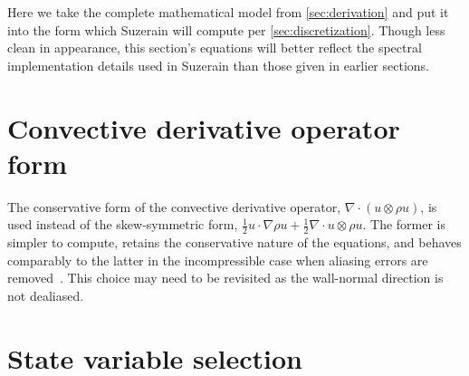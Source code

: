 \documentclass[letterpaper,11pt,nointlimits,reqno,draft]{amsbook}
\begin{document}
Here we take the complete mathematical model from \autoref{sec:derivation}
and put it into the form which Suzerain will compute per
\autoref{sec:discretization}.  Though less clean in appearance, this section's
equations will better reflect the spectral implementation details used in
Suzerain than those given in earlier sections.

\section{Convective derivative operator form}

The conservative form of the convective derivative operator,
$\nabla\cdot\left(u\otimes{}\rho{}u\right)$, is used instead of the
skew-symmetric form, $\frac{1}{2}u\cdot\nabla{}\rho{}u +
\frac{1}{2}\nabla\cdot{}u\otimes{}\rho{}u$.  The former is simpler to compute,
retains the conservative nature of the equations, and behaves comparably to the
latter in the incompressible case when aliasing errors are
removed~\citep{Zang1991Rotation}.  This choice may need to be revisited as the
wall-normal direction is not dealiased.

\section{State variable selection}
\label{state_variable_selection}
\end{document}
